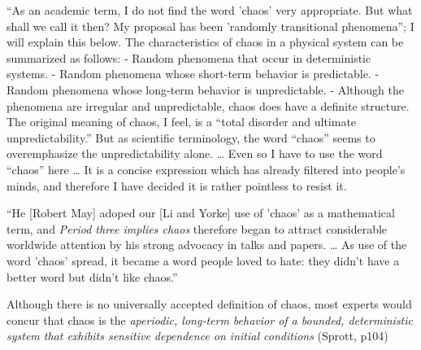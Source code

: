 \documentclass[12pt,twoside]{book}
\begin{document}
``As an academic term, I do not find the word 'chaos' very appropriate.
But what shall we call it then?
My proposal has been 'randomly transitional phenomena''; I will explain this below.
The characteristics of chaos in a physical system can be summarized as follows:
- Random phenomena that occur in deterministic systems.
- Random phenomena whose short-term behavior is predictable.
- Random phenomena whose long-term behavior is unpredictable.
- Although the phenomena are irregular and unpredictable, chaos does have a definite structure.
The original meaning of chaos, I feel, is a ``total disorder and ultimate unpredictability.''
But as scientific terminology, the word ``chaos'' seems to overemphasize the unpredictability alone.
\ldots
Even so I have to use the word ``chaos'' here \ldots
It is a concise expression which has already filtered into people's minds, and therefore I have decided it is rather pointless to resist it.
\citep[24]{ueda-abraham}

``He [Robert May] adoped our [Li and Yorke] use of 'chaos' as a mathematical term, and \textit{Period three implies chaos} therefore began to attract considerable worldwide attention by his strong advocacy in talks and papers.
\ldots
As use of the word 'chaos' spread, it became a word people loved to hate: they didn't have a better word but didn't like chaos.''
\citep[205]{ueda-abraham}

Although there is no universally accepted definition of chaos, most experts would concur that chaos is the {\it aperiodic, long-term behavior of a bounded, deterministic system that exhibits sensitive dependence on initial conditions} (Sprott, p104)



\end{document}

